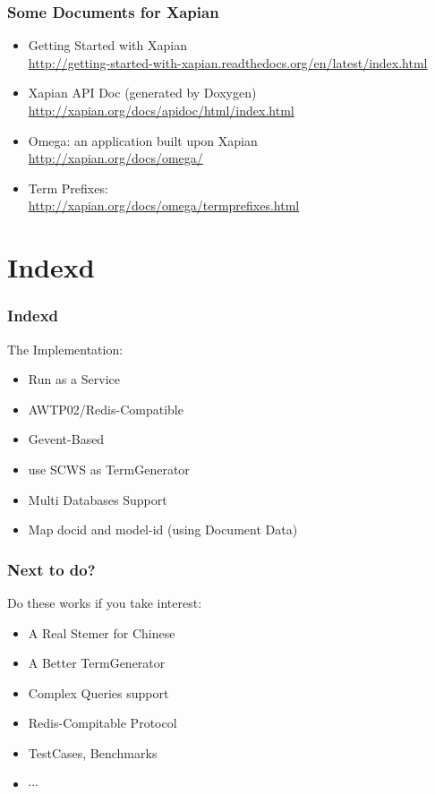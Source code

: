 \documentclass[unicode]{beamer}
\begin{document}
\begin{CJK}{UTF8}{gbsn}
  \begin{frame}
    \frametitle{Some Documents for Xapian}
    \begin{itemize}
    \item Getting Started with Xapian\\
      {\tiny \url{http://getting-started-with-xapian.readthedocs.org/en/latest/index.html}}
    \item Xapian API Doc (generated by Doxygen) \\
      {\tiny \url{http://xapian.org/docs/apidoc/html/index.html}}
    \item Omega: an application built upon Xapian \\
      {\tiny \url{http://xapian.org/docs/omega/}}
    \item Term Prefixes:\\
      {\tiny \url{http://xapian.org/docs/omega/termprefixes.html}}
    \end{itemize}
  \end{frame}

  \section{Indexd}
  \begin{frame}
    \frametitle{Indexd}
    The Implementation: \vfill
    \begin{itemize}
    \item Run as a Service \vfill
    \item AWTP02/Redis-Compatible \vfill
    \item Gevent-Based \vfill
    \item use SCWS as TermGenerator \vfill
    \item Multi Databases Support \vfill
    \item Map docid and model-id (using Document Data)
    \end{itemize}
  \end{frame}

  \begin{frame}
    \frametitle{Next to do?}
    Do these works if you take interest: \vfill
    \begin{itemize}
    \item A Real Stemer for Chinese
    \item A Better TermGenerator
    \item Complex Queries support
    \item Redis-Compitable Protocol
    \item TestCases, Benchmarks
    \item $\cdots$
    \end{itemize}
  \end{frame}


\end{CJK}
\end{document}

